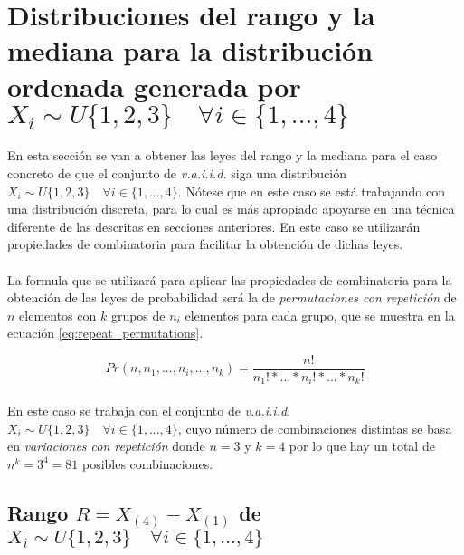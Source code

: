 \documentclass{article}
\begin{document}
  \section{Distribuciones del rango y la mediana para la distribución ordenada generada por $X_i \sim U\{1,2,3\} \quad \forall i  \in \{1,...,4\}$}
  \label{sec:e3}

    \paragraph{}
    En esta sección se van a obtener las leyes del rango y la mediana para el caso concreto de que el conjunto de \emph{v.a.i.i.d.} siga una distribución $X_i \sim U\{1,2,3\} \quad \forall i  \in \{1,...,4\}$. Nótese que en este caso se está trabajando con una distribución discreta, para lo cual es más apropiado apoyarse en una técnica diferente de las descritas en secciones anteriores. En este caso se utilizarán propiedades de combinatoria para facilitar la obtención de dichas leyes.

    \paragraph{}
    La formula que se utilizará para aplicar las propiedades de combinatoria para la obtención de las leyes de probabilidad será la de \emph{permutaciones con repetición} de $n$ elementos con $k$ grupos de $n_i$ elementos para cada grupo, que se muestra en la ecuación \eqref{eq:repeat_permutations}.

    \begin{equation}
    \label{eq:repeat_permutations}
      Pr(n, n_1, ..., n_i,...,n_k) = \frac{n!}{n_1! *... *n_i! * ... * n_k!}
    \end{equation}

    \paragraph{}
    En este caso se trabaja con el conjunto de \emph{v.a.i.i.d.} $X_i \sim U\{1,2,3\} \quad \forall i  \in \{1,...,4\}$, cuyo número de combinaciones distintas se basa en \emph{variaciones con repetición} donde $n = 3$ y $k=4$ por lo que hay un total de $n^k = 3^4 = 81$ posibles combinaciones.

    \subsection{Rango $R=X_{(4)}-X_{(1)}$ de $X_i \sim U\{1,2,3\} \quad \forall i  \in \{1,...,4\}$}
\end{document}
